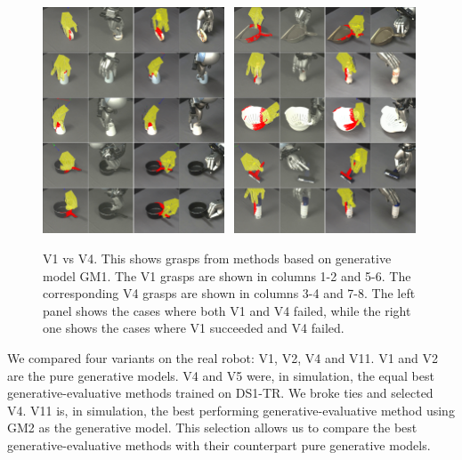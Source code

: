 \begin{figure}
\begin{center}
\includegraphics[width=0.48\textwidth]{plots/A2fA9f_vertical.png}~
\includegraphics[width=0.48\textwidth]{plots/A2sA9f_vertical.png}
\caption{V1 vs V4. This shows grasps from methods based on generative model GM1. The V1 grasps are shown in columns 1-2 and 5-6. The corresponding V4 grasps are shown in columns 3-4 and 7-8. The left panel shows the cases where both V1 and V4 failed, while the right one shows the cases where V1 succeeded and V4 failed. \label{fig:v1fsv4f}}
\end{center}
\end{figure}

We compared four variants on the real robot: V1, V2, V4 and V11. V1 and V2 are the pure generative models. V4 and V5 were, in simulation, the equal best generative-evaluative methods trained on DS1-TR. We broke ties and selected V4. V11 is, in simulation, the best performing generative-evaluative method using GM2 as the generative model. This selection allows us to compare the best generative-evaluative methods with their counterpart pure generative models. 

